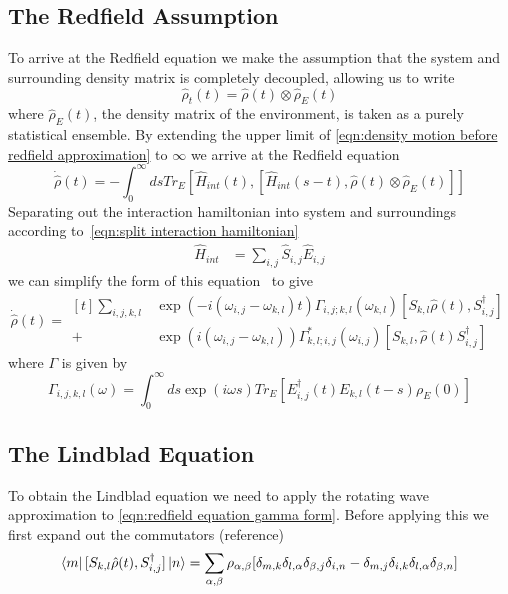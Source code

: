 \subsection{The Redfield Assumption}\label{sec:the redfield assumption}
To arrive at the Redfield equation
we make the assumption that the
system and surrounding density
matrix is completely decoupled,
allowing us to write
\begin{equation}
    \hat{\rho}_t(t) = \hat{\rho}(t) \otimes \hat{\rho}_E(t)
\end{equation}
where \(\hat{\rho}_E(t)\), the
density matrix of the environment,
is taken as a purely statistical ensemble.
By extending the upper limit
of \cref{eqn:density motion before redfield approximation}
to \(\infty \) we arrive at the Redfield
equation
\begin{equation}
    \dot{\hat{\rho}}(t) =
    - \int_0^{\infty} ds
    Tr_{E}[\hat{H}_{int}(t),
            [\hat{H}_{int}(s-t),
                    \hat{\rho}(t) \otimes \hat{\rho}_E(t)]]
\end{equation}
Separating out the interaction hamiltonian
into system and surroundings according
to~\cref{eqn:split interaction hamiltonian}
\begin{align}
    \hat{H}_{int} & = \sum_{i,j} \hat{S}_{i,j} \hat{E}_{i,j}
\end{align}
we can simplify the form of this equation~\cite{Manzano_2020} to give
\begin{equation}
    \dot{\hat{\rho{}}}(t) = \begin{aligned}[t]
        \sum_{i,j,k, l} &
        \exp{(-i(\omega_{i,j}-\omega_{k,l})t)}
        \Gamma_{i,j;k, l}(\omega_{k,l})
        [S_{k, l}\hat{\rho}(t),
        S^\dagger_{i,j}]  \\
        +               &
        \exp{(i(\omega_{i,j}-\omega_{k,l}))}
        \Gamma^*_{k, l; i,j}(\omega_{i,j})
        [S_{k, l},
            \hat{\rho}(t) S^\dagger_{i,j}]
    \end{aligned} \label{eqn:redfield equation gamma form}
\end{equation}
where \(\Gamma \) is given by
\begin{equation}
    \Gamma_{i,j, k,l}(\omega) =
    \int_0^\infty{}{
    ds \exp{(i\omega{}s)}
    Tr_{E}[E^\dagger_{i,j}(t)E_{k,l}(t-s)\rho_E(0)]
    }\label{eqn:gamma definition}
\end{equation}

\subsection{The Lindblad Equation}
To obtain the Lindblad equation
we need to apply the rotating
wave approximation to
\cref{eqn:redfield equation gamma form}.
Before applying this
we first expand out the commutators
(reference)
\begin{equation}
    \bra{m}[S_{k, l}\hat{\rho}(t),
        S^\dagger_{i, j}] \ket{n} =
    \sum_{\alpha, \beta} \rho_{\alpha, \beta} [
        \delta_{m, k}\delta_{l, \alpha}
        \delta_{\beta, j}\delta_{i, n}
        -\delta_{m, j}\delta_{i, k}
        \delta_{l, \alpha}\delta_{\beta, n}]
\end{equation}

